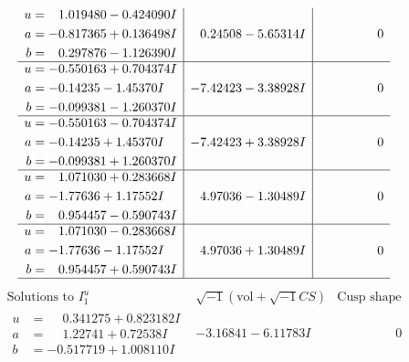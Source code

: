 \documentclass[1p]{elsarticle_modified}
\theoremstyle{definition}
\newcommand{\I}{\sqrt{-1}}
\begin{document}
$$\begin{array}{c|c|c}
\begin{aligned}
u &= \phantom{-}1.019480 - 0.424090 I \\
a &= -0.817365 + 0.136498 I \\
b &= \phantom{-}0.297876 - 1.126390 I\end{aligned}
 & \phantom{-}0.24508 - 5.65314 I & \phantom{-0.000000 } 0 \\ \hline\begin{aligned}
u &= -0.550163 + 0.704374 I \\
a &= -0.14235 - 1.45370 I \\
b &= -0.099381 - 1.260370 I\end{aligned}
 & -7.42423 - 3.38928 I & \phantom{-0.000000 } 0 \\ \hline\begin{aligned}
u &= -0.550163 - 0.704374 I \\
a &= -0.14235 + 1.45370 I \\
b &= -0.099381 + 1.260370 I\end{aligned}
 & -7.42423 + 3.38928 I & \phantom{-0.000000 } 0 \\ \hline\begin{aligned}
u &= \phantom{-}1.071030 + 0.283668 I \\
a &= -1.77636 + 1.17552 I \\
b &= \phantom{-}0.954457 - 0.590743 I\end{aligned}
 & \phantom{-}4.97036 - 1.30489 I & \phantom{-0.000000 } 0 \\ \hline\begin{aligned}
u &= \phantom{-}1.071030 - 0.283668 I \\
a &= -1.77636 - 1.17552 I \\
b &= \phantom{-}0.954457 + 0.590743 I\end{aligned}
 & \phantom{-}4.97036 + 1.30489 I & \phantom{-0.000000 } 0\\
 \hline 
 \end{array}$$\newpage$$\begin{array}{c|c|c}  
\text{Solutions to }I^u_{1}& \I (\text{vol} + \sqrt{-1}CS) & \text{Cusp shape}\\
 \hline 
\begin{aligned}
u &= \phantom{-}0.341275 + 0.823182 I \\
a &= \phantom{-}1.22741 + 0.72538 I \\
b &= -0.517719 + 1.008110 I\end{aligned}
 & -3.16841 - 6.11783 I & \phantom{-0.000000 } 0 \\ \hline\begin{aligned}

\end{aligned}
\end{array}$$
\end{document}

